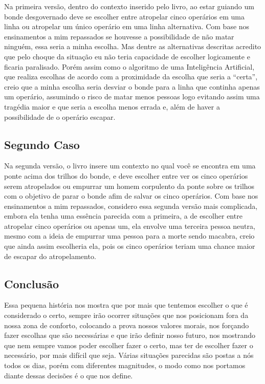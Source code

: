 \documentclass[12pt]{article}
\begin{document}
Na primeira versão, dentro do contexto inserido pelo livro, ao estar guiando um bonde desgovernado deve se escolher entre atropelar cinco operários em uma linha ou atropelar um único operário em uma linha alternativa. Com base nos ensinamentos a mim repassados se houvesse a possibilidade de não matar ninguém, essa seria a minha escolha. Mas dentre as alternativas descritas acredito que pelo choque da situação eu não teria capacidade de escolher logicamente e ficaria paralisado. Porém assim como o algoritmo de uma Inteligência Artificial, que realiza escolhas de acordo com a proximidade da escolha que seria a “certa”, creio que a minha escolha seria desviar o bonde para a linha que continha apenas um operário, assumindo o risco de matar menos pessoas logo evitando assim uma tragédia maior e que seria a escolha menos errada e, além de haver a possibilidade de o operário escapar.

\subsection{Segundo Caso}

Na segunda versão, o livro insere um contexto no qual você se encontra em uma ponte acima dos trilhos do bonde, e deve escolher entre ver os cinco operários serem atropelados ou empurrar um homem corpulento da ponte sobre os trilhos com o objetivo de parar o bonde afim de salvar os cinco operários. Com base nos ensinamentos a mim repassados, considero essa segunda versão mais complicada, embora ela tenha uma essência parecida com a primeira, a de escolher entre atropelar cinco operários ou apenas um, ela envolve uma terceira pessoa neutra, mesmo com a ideia de empurrar uma pessoa para a morte sendo macabra, creio que ainda assim escolheria ela, pois os cinco operários teriam uma chance maior de escapar do atropelamento.

\subsection{Conclusão}

Essa pequena história nos mostra que por mais que tentemos escolher o que é considerado o certo, sempre irão ocorrer situações que nos posicionam fora da nossa zona de conforto, colocando a prova nossos valores morais, nos forçando fazer escolhas que são necessárias e que irão definir nosso futuro, nos mostrando que nem sempre vamos poder escolher fazer o certo, mas ter de escolher fazer o necessário, por mais difícil que seja. Várias situações parecidas são postas a nós todos os dias, porém com diferentes magnitudes, o modo como nos portamos diante dessas decisões é o que nos define.
\end{document}
